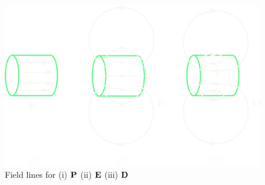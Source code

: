 \documentclass[../main.tex]{subfiles}
\begin{document}
\begin{figure}[ht]
    \centering
    \includegraphics[width=0.8\linewidth]{hw7_1.png}
    \captionsetup{width=0.8\linewidth}
    \caption{Field lines for (i) $\vb P$ (ii) $\vb E$ (iii) $\vb D$}
    \label{fig:hw7_1}
\end{figure}

\newpage
\end{document}
